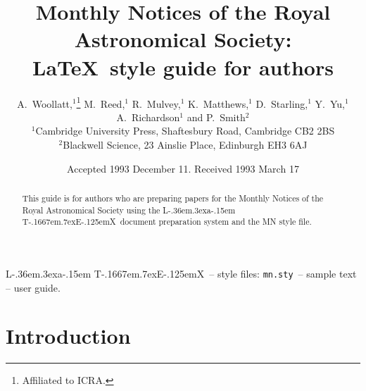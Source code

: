 \ifCUPmtlplainloaded \else
  \ifAMStwofonts \else %
    \def\upi{\pi}
    \def\umu{\mu}
    \def\upartial{\partial}
  \fi
\fi

\long{} %


\title[Monthly Notices: \LaTeX\ guide for authors]
  {Monthly Notices of the Royal Astronomical 
  Society: \\ \LaTeX\ style guide for authors}
\author[A. Woollatt et al.]
  {A.~Woollatt,$^1$\thanks{Affiliated to ICRA.} 
  M.~Reed,$^1$ R.~Mulvey,$^1$ K.~Matthews,$^1$ 
  D.~Starling,$^1$ Y.~Yu,$^1$
  \newauthor %
  A.~Richardson$^1$ and P.~Smith$^2$\\
  $^1$Cambridge University Press, Shaftesbury
      Road, Cambridge CB2 2BS\\
  $^2$Blackwell Science,
      23 Ainslie Place, Edinburgh EH3 6AJ}
\date{Accepted 1993 December 11. Received 1993 March 17}
\pagerange{\pageref{firstpage}--\pageref{lastpage}}

\def\LaTeX{L\kern-.36em\raise.3ex\hbox{a}\kern-.15em
    T\kern-.1667em\lower.7ex\hbox{E}\kern-.125emX}

\newtheorem{theorem}{Theorem}[section]



\label{firstpage}

\maketitle

\begin{abstract}
 This guide is for authors who are preparing papers for the
 Monthly Notices of the Royal Astronomical Society using the
\LaTeX\ document preparation system and the MN style file.
\end{abstract}

\begin{keywords}
 \LaTeX\ -- style files: \verb"mn.sty"\ -- sample text -- user guide.
\end{keywords}

\section{Introduction}

